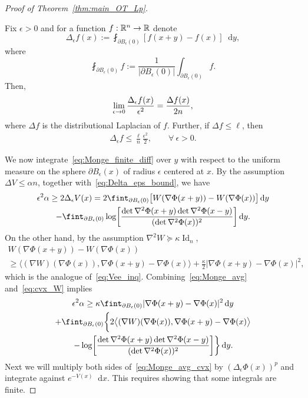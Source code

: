\documentclass[AHL,Unicode,longabstracts]{cedram}
\newcommand{\R}{\mathbb R}
\DeclareMathOperator{\Id}{Id}
\newcommand{\W}{W}
\newcommand{\dd}{n}
\newcommand{\lsh}{\alpha}
\newcommand{\lc}{\kappa}
\newcommand*\diff{\mathop{}\!\mathrm{d}}
\newcommand{\OT}{\Phi}
\newcommand{\avgint}{\fint}
\renewcommand*{\to}{\mathchoice{\longrightarrow}{\rightarrow}{\rightarrow}{\rightarrow}}
\let\originalleft\left
\let\originalright\right
\renewcommand{\left}{\mathopen{}\mathclose\bgroup\originalleft}
\renewcommand{\right}{\aftergroup\egroup\originalright}
\let\oldforall\forall
\renewcommand*{\forall}{\mathrel{\oldforall}}
\begin{document}
\begin{proof}[Proof of Theorem~\ref{thm:main_OT_Lp}]
\begin{lemm}\label{lem:avg_Laplacian}
Fix $\epsilon> 0$ and for a function $f:\R^{\dd}\to\R$ denote
\begin{equation}\label{eq:avg_Laplacian_def}
\Delta_{\epsilon}f(x):=\avgint_{\partial B_{\epsilon}(0)}[f(x+y)-f(x)]\diff y,
\end{equation}
where
\[
\avgint_{\partial B_{\epsilon}(0)}f:=\frac{1}{|\partial B_{\epsilon}(0)|}\int_{\partial B_{\epsilon}(0)}f.
\]
Then,
\begin{align}\label{eq:Delta_eps_lim}
\lim_{\epsilon\to 0}\frac{\Delta_{\epsilon}f(x)}{\epsilon^{2}}=\frac{\Delta f(x)}{2\dd},
\end{align}
where $\Delta f$ is the distributional Laplacian of $f$. Further, if $\Delta f\le \ell$, then
\begin{align}\label{eq:Delta_eps_bound}
\Delta_{\epsilon}f\le \frac{\ell}{\dd}\frac{\epsilon^2}{2},\quad \quad\forall~\epsilon>0.
\end{align}
\end{lemm}

We now integrate~\eqref{eq:Monge_finite_diff} over $y$ with respect to the uniform measure on the sphere $\partial B_{\epsilon}(x)$ of radius $\epsilon$ centered at $x$. By the assumption $\Delta V\le \lsh\dd$, together with~\eqref{eq:Delta_eps_bound}, we have
\begin{multline}\label{eq:Monge_avg}
\epsilon^2 \lsh\ge 2\Delta_{\epsilon}V(x)=2\avgint_{\partial B_{\epsilon}(0)}\bigl[\W(\nabla\OT(x+y))-\W(\nabla\OT(x))\bigr]\diff y
\\
-\avgint_{\partial B_{\epsilon}(0)}\log\left[\frac{\det \nabla^2\OT(x+y)\det \nabla^2\OT(x-y)}{(\det \nabla^2\OT(x))^2}\right]\diff y.
\end{multline}
On the other hand, by the assumption $\nabla^2\W \succeq \lc \Id_{\dd}$,
\begin{multline}\label{eq:cvx_W}
\W(\nabla\OT(x+y))-\W(\nabla\OT(x))\\
\ge \bigl\langle (\nabla \W)(\nabla\OT(x)),\nabla\OT(x+y)-\nabla\OT(x)\bigr\rangle+\frac{\lc}{2}|\nabla\OT(x+y)-\nabla\OT(x)|^2,
\end{multline}
which is the analogue of~\eqref{eq:Vee_inq}. Combining~\eqref{eq:Monge_avg} and~\eqref{eq:cvx_W} implies
\begin{multline}\label{eq:Monge_avg_cvx}
\epsilon^2 \lsh \ge \lc\avgint_{\partial B_{\epsilon}(0)}|\nabla\OT(x+y)-\nabla\OT(x)|^2\diff y
\\
+\avgint_{\partial B_{\epsilon}(0)}\bigg\{2\bigl\langle (\nabla \W)(\nabla\OT(x)),\nabla\OT(x+y)-\nabla\OT(x)\bigr\rangle\\
\left.-\log\left[\frac{\det \nabla^2\OT(x+y)\det \nabla^2\OT(x-y)}{(\det \nabla^2\OT(x))^2}\right]\right\}\diff y.
\end{multline}
Next we will multiply both sides of~\eqref{eq:Monge_avg_cvx} by $(\Delta_{\epsilon}\OT(x))^p$ and integrate against $e^{-V(x)}\diff x$. This requires showing that some integrals are finite.


\end{proof}
\end{document}
